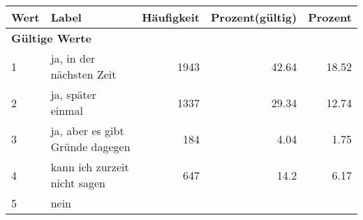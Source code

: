      \begin{longtable}{lXrrr}
     \toprule
     \textbf{Wert} & \textbf{Label} & \textbf{Häufigkeit} & \textbf{Prozent(gültig)} & \textbf{Prozent} \\
     \endhead
     \midrule
     \multicolumn{5}{l}{\textbf{Gültige Werte}}\\

     1 &
     \multicolumn{1}{X}{ ja, in der nächsten Zeit   } &


       \num{1943} &
       \num[round-mode=places,round-precision=2]{42,64} &
         \num[round-mode=places,round-precision=2]{18,52} \\

     2 &
     \multicolumn{1}{X}{ ja, später einmal   } &


       \num{1337} &
       \num[round-mode=places,round-precision=2]{29,34} &
         \num[round-mode=places,round-precision=2]{12,74} \\

     3 &
     \multicolumn{1}{X}{ ja, aber es gibt Gründe dagegen   } &


       \num{184} &
       \num[round-mode=places,round-precision=2]{4,04} &
         \num[round-mode=places,round-precision=2]{1,75} \\

     4 &
     \multicolumn{1}{X}{ kann ich zurzeit nicht sagen   } &


       \num{647} &
       \num[round-mode=places,round-precision=2]{14,2} &
         \num[round-mode=places,round-precision=2]{6,17} \\

     5 &
     \multicolumn{1}{X}{ nein   } &



\end{longtable}
